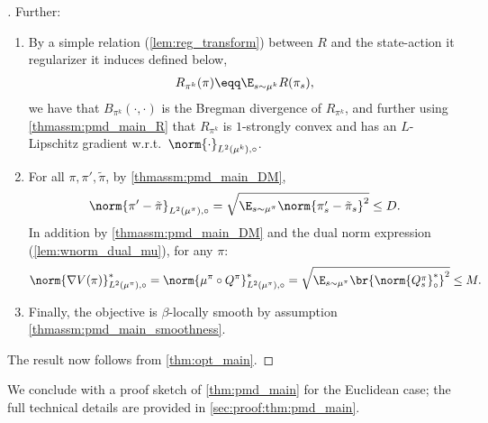 \begin{proof}[\unskip\nopunct]
        Further:
        \begin{enumerate} 
            \item By a simple relation (\cref{lem:reg_transform}) between $R$ and the state-action it regularizer it induces defined below,
        \begin{align*}
            R_{\pi^k}(\pi)\eqq \E_{s \sim \mu^k}R(\pi_s),
        \end{align*}
        we have that $B_{\pi^k}(\cdot, \cdot)$ is the Bregman divergence of $R_{\pi^k}$, and further using
        \ref{thmassm:pmd_main_R} that 
        $R_{\pi^k}$ is $1$-strongly convex and has an $L$-Lipschitz gradient w.r.t.~$\norm{\cdot}_{L^2(\mu^k), \circ}$.
            \item For all $\pi, \pi', \tilde \pi$, by \ref{thmassm:pmd_main_DM},
        \begin{align*}
            \norm{\pi' - \tilde \pi}_{L^2(\mu^\pi), \circ}
            =\sqrt{\E_{s\sim \mu^\pi}\norm{\pi'_s - \tilde \pi_s}^2}
            \leq D.
        \end{align*}
        In addition by \ref{thmassm:pmd_main_DM} and the dual norm expression (\cref{lem:wnorm_dual_mu}), for any $\pi$:
        \begin{align*}
            \norm{\nabla V(\pi)}_{L^2(\mu^\pi), \circ}^*
            =
            \norm{\mu^\pi \circ Q^\pi}_{L^2(\mu^\pi), \circ}^*
            =
            \sqrt{\E_{s \sim \mu^\pi} \br{\norm{Q^\pi_s}_\circ^*}^2}
            \leq M.
        \end{align*}
            \item Finally, the objective is $\beta$-locally smooth by assumption \ref{thmassm:pmd_main_smoothness}.
        \end{enumerate}
        The result now follows from \cref{thm:opt_main}.
    \end{proof}
    We conclude with a proof sketch of \cref{thm:pmd_main} for the Euclidean case; the full technical details are provided in \cref{sec:proof:thm:pmd_main}.

